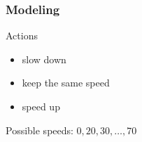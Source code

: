 \documentclass[dvipsnames,svgnames]{beamer}
\begin{document}
\begin{frame}
\frametitle{Modeling}
\begin{block}{Actions}
\begin{itemize}
\item slow down
\item keep the same speed 
\item speed up
\end{itemize}
\end{block}
Possible speeds: $0, 20, 30, \ldots, 70$
\end{frame}
%
%		        
\end{document}

